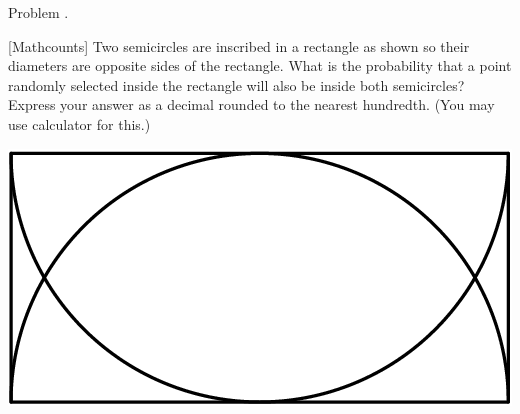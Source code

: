 \documentclass[9pt]{beamer}
\newcounter{problem}[section]
\begin{document}
\begin{frame}[t, fragile]{Problem \thesection.\theproblem}
    \begin{block}{}[Mathcounts]
Two semicircles are inscribed in a rectangle as shown so their diameters are opposite sides of the rectangle. What is the probability that a point randomly selected inside the rectangle will also be inside both semicircles? Express your answer as a decimal rounded to the nearest hundredth. (You may use calculator for this.)

    \end{block}
    \begin{center}
        \includegraphics[scale=0.5]{images/38bfd76b3eb6bc5f6291aca8255bd167b545e722.png}
        \end{center}
        
        \end{frame}
\end{document}
